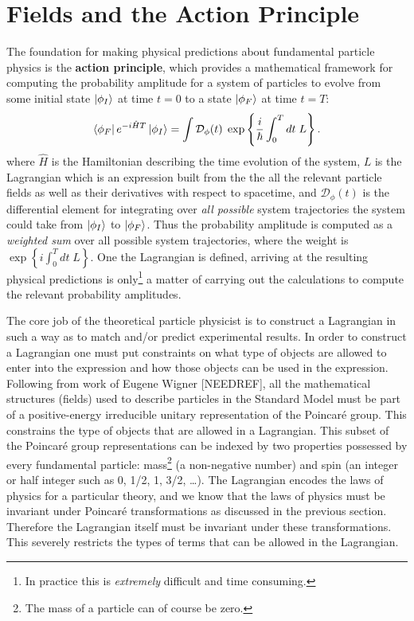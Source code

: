 \section{Fields and the Action Principle}
The foundation for making physical predictions about fundamental particle physics is the \textbf{action principle}, which provides a mathematical framework for computing the probability amplitude for a system of particles to evolve from some initial state $\ket{\phi_I}$ at time $t=0$ to a state $\ket{\phi_F}$ at time $t=T$:
\begin{equation}
    \bra{\phi_F} e^{-i\hat{H}T} \ket{\phi_I} = \int \mathcal{D}_{\phi}(t)\; \exp \left\{ \frac{i}{\hbar} \int_{0}^{T} dt\; L \right\}.
\end{equation}
where $\hat{H}$ is the Hamiltonian describing the time evolution of the system, $L$ is the Lagrangian which is an expression built from the the all the relevant particle fields as well as their derivatives with respect to spacetime, and $\mathcal{D}_{\phi}(t)$ is the differential element for integrating over \textit{all possible} system trajectories the system could take from $\ket{\phi_I}$ to $\ket{\phi_F}$.
Thus the probability amplitude is computed as a \textit{weighted sum} over all possible system trajectories, where the weight is $\exp \left\{ i \int_{0}^{T} dt\; L \right\}$.
One the Lagrangian is defined, arriving at the resulting physical predictions is only\footnote{In practice this is \textit{extremely} difficult and time consuming.} a matter of carrying out the calculations to compute the relevant probability amplitudes.


The core job of the theoretical particle physicist is to construct a Lagrangian in such a way as to match and/or predict experimental results.
In order to construct a Lagrangian one must put constraints on what type of objects are allowed to enter into the expression and how those objects can be used in the expression.
Following from work of Eugene Wigner [NEEDREF], all the mathematical structures (fields) used to describe particles in the Standard Model must be part of a positive-energy irreducible unitary representation of the Poincar\'{e} group.
This constrains the type of objects that are allowed in a Lagrangian.
This subset of the Poincar\'{e} group representations can be indexed by two properties possessed by every fundamental particle: mass\footnote{The mass of a particle can of course be zero.} (a non-negative number) and spin (an integer or half integer such as 0, 1/2, 1, 3/2, \dots).
The Lagrangian encodes the laws of physics for a particular theory, and we know that the laws of physics must be invariant under Poincar\'{e} transformations as discussed in the previous section.
Therefore the Lagrangian itself must be invariant under these transformations.
This severely restricts the types of terms that can be allowed in the Lagrangian.

